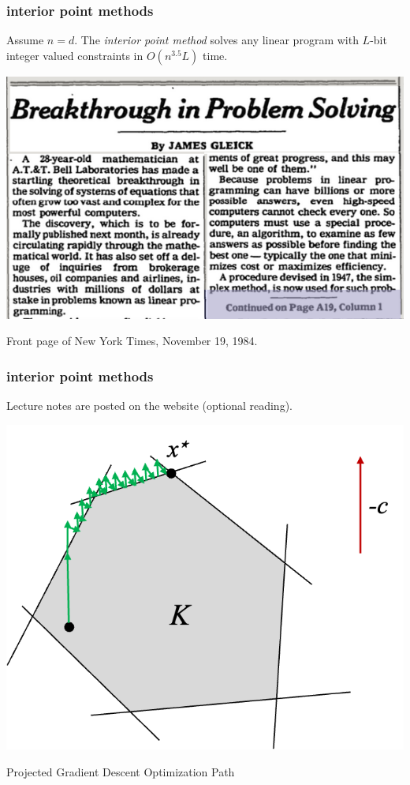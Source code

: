\documentclass[compress]{beamer}
\begin{document}
\begin{frame}[t]
	\frametitle{interior point methods}
	\begin{theorem}[Karmarkar, 1984]
		Assume $n=d$. The \emph{interior point method} solves any linear program with $L$-bit integer valued constraints in $O(n^{3.5}L)$ time. 
	\end{theorem}
	\begin{center}
	\includegraphics[width=.7\textwidth]{interiornews.png}
	
			Front page of New York Times, November 19, 1984.
	\end{center}
\end{frame}

\begin{frame}[t]
	\frametitle{interior point methods}
	Lecture notes are posted on the website (optional reading).
	\begin{center}
			\includegraphics[width=.6\textwidth]{projected_gradient.png}
			
			Projected Gradient Descent Optimization Path
	\end{center}

\end{frame}
\end{document}

